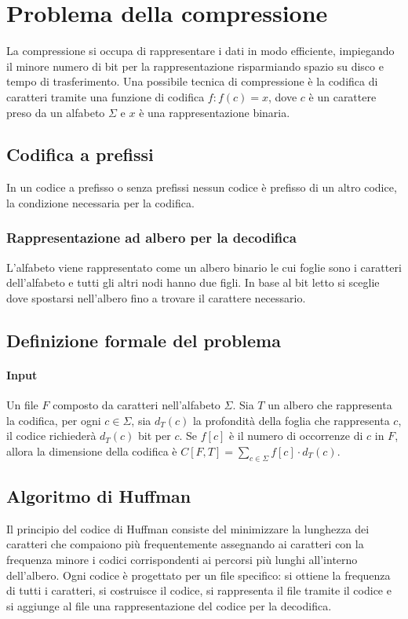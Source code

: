 \section{Problema della compressione}
La compressione si occupa di rappresentare i dati in modo efficiente, impiegando il minore numero di bit per la rappresentazione risparmiando spazio su disco e tempo di trasferimento.
Una possibile tecnica di compressione \`e la codifica di caratteri tramite una funzione di codifica $f:f(c) = x$, dove $c$ \`e un carattere preso da un alfabeto $\Sigma$ e $x$ \`e una
rappresentazione binaria. 
\subsection{Codifica a prefissi}
In un codice a prefisso o senza prefissi nessun codice \`e prefisso di un altro codice, la condizione necessaria per la codifica. 
\subsubsection{Rappresentazione ad albero per la decodifica}
L'alfabeto viene rappresentato come un albero binario le cui foglie sono i caratteri dell'alfabeto e tutti gli altri nodi hanno due figli. In base al bit letto si sceglie dove spostarsi
nell'albero fino a trovare il carattere necessario.

\subsection{Definizione formale del problema}
\paragraph{Input}
Un file $F$ composto da caratteri nell'alfabeto $\Sigma$. Sia $T$ un albero che rappresenta la codifica, per ogni $c\in\Sigma$, sia $d_T(c)$ la profondit\`a della foglia che rappresenta
$c$, il codice richieder\`a $d_T(c)$ bit per $c$. Se $f[c]$ \`e il numero di occorrenze di $c$ in $F$, allora la dimensione della codifica \`e $C[F, T] = \sum\limits_{c\in\Sigma}f[c]
\cdot d_T(c)$.
\subsection{Algoritmo di Huffman}
Il principio del codice di Huffman consiste del minimizzare la lunghezza dei caratteri che compaiono pi\`u frequentemente assegnando ai caratteri con la frequenza minore i codici 
corrispondenti ai percorsi pi\`u lunghi all'interno dell'albero. Ogni codice \`e progettato per un file specifico: si ottiene la frequenza di tutti i caratteri, si costruisce il 
codice, si rappresenta il file tramite il codice e si aggiunge al file una rappresentazione del codice per la decodifica. 
